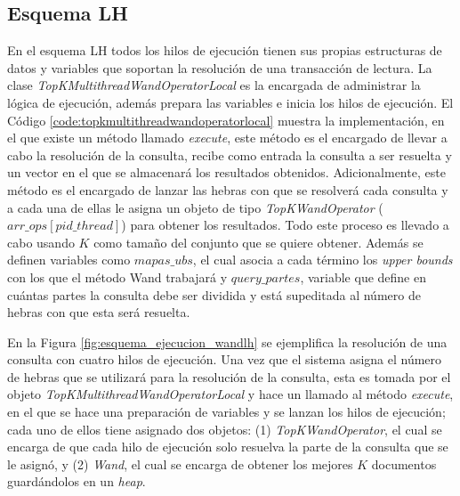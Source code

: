 \subsection{Esquema LH}
\label{evaluacionexperimental:esquemalh}
En el esquema LH todos los hilos de ejecución tienen sus propias estructuras de datos y variables que soportan la resolución de una transacción de lectura. La clase \textit{TopKMultithreadWandOperatorLocal} es la encargada de administrar la lógica de ejecución, además prepara las variables e inicia los hilos de ejecución. El Código \ref{code:topkmultithreadwandoperatorlocal} muestra la implementación, en el que existe un método llamado \textit{execute}, este método es el encargado de llevar a cabo la resolución de la consulta, recibe como entrada la consulta a ser resuelta y un vector en el que se almacenará los resultados obtenidos. Adicionalmente, este método es el encargado de lanzar las hebras con que se resolverá cada consulta y a cada una de ellas le asigna un objeto de tipo \textit{TopKWandOperator} ($arr\_ops[pid\_thread]$) para obtener los resultados. Todo este proceso es llevado a cabo usando $K$ como tamaño del conjunto que se quiere obtener. Además se definen variables como \textit{$mapas\_ubs$}, el cual asocia a cada término los \textit{upper bounds} con los que el método Wand trabajará y \textit{$query\_partes$}, variable que define en cuántas partes la consulta debe ser dividida y está supeditada al número de hebras con que esta será resuelta.



En la Figura \ref{fig:esquema_ejecucion_wandlh} se ejemplifica la resolución de una consulta con cuatro hilos de ejecución. Una vez que el sistema asigna el número de hebras que se utilizará para la resolución de la consulta, esta es tomada por el objeto \textit{TopKMultithreadWandOperatorLocal} y hace un llamado al método \textit{execute}, en el que se hace una preparación de variables y se lanzan los hilos de ejecución; cada uno de ellos tiene asignado dos objetos: (1) \textit{TopKWandOperator}, el cual se encarga de que cada hilo de ejecución solo resuelva la parte de la consulta que se le asignó, y (2) \textit{Wand}, el cual se encarga de obtener los mejores $K$ documentos guardándolos en un \textit{heap}.

